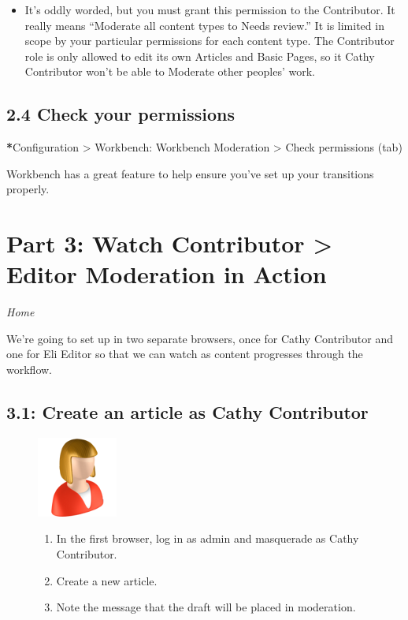 \documentclass[letterpaper,10pt,english]{sphinxmanual}
\begin{document}
\begin{itemize}
\item {} 
It's oddly worded, but you must grant this permission to the Contributor. It really means ``Moderate all content types to Needs review.'' It is limited in scope by your particular permissions for each content type. The Contributor role is only allowed to edit its own Articles and Basic Pages, so it Cathy Contributor won't be able to Moderate other peoples' work.

\end{itemize}


\subsection{2.4 Check your permissions}
\label{workbench:check-your-permissions}
{\color{red}\bfseries{}*}Configuration \textgreater{} Workbench: Workbench Moderation \textgreater{} Check permissions (tab)

Workbench has a great feature to help ensure you've set up your transitions properly.


\section{Part 3: Watch Contributor \textgreater{} Editor Moderation in Action}
\label{workbench:part-3-watch-contributor-editor-moderation-in-action}
\emph{Home}

We're going to set up in two separate browsers, once for Cathy Contributor and one for Eli Editor so that we can watch as content progresses through the workflow.


\subsection{3.1: Create an article as Cathy Contributor}
\label{workbench:create-an-article-as-cathy-contributor}\begin{figure}[htbp]
\centering

\includegraphics{contributor.png}
{\small \begin{enumerate}
\item {} 
In the first browser, log in as admin and masquerade as Cathy Contributor.

\item {} 
Create a new article.

\item {} 
Note the message that the draft will be placed in moderation.

\end{enumerate}
}\end{figure}
\end{document}

